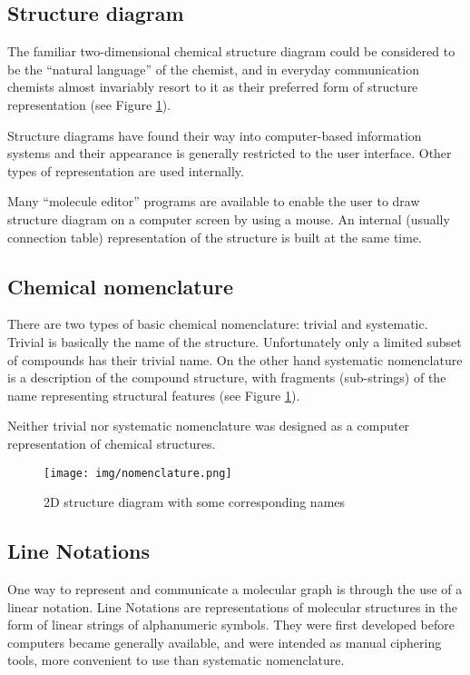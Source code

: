 \documentclass[thesis=M,english]{FITthesis}[2012/10/20]
\begin{document}
\subsection{Structure diagram}
\label{structureDiagramRef}
The familiar two-dimensional chemical structure diagram could be considered to
be the “natural language” of the chemist, and in everyday communication chemists almost invariably resort to it as their preferred form of structure representation (see Figure \ref{fig:nomenclature}).

Structure diagrams have found their way into computer-based information systems and their appearance is generally restricted to the user interface. Other types of representation are used internally.

Many “molecule editor” programs are available to enable the user to draw structure diagram on a computer screen by using a mouse. An internal (usually connection table) representation of the structure is built at the same time.\cite{handbook}

\subsection{Chemical nomenclature}
There are two types of basic chemical nomenclature: trivial and systematic. Trivial is basically the name of the structure. Unfortunately only a limited subset of compounds has their trivial name. On the other hand systematic nomenclature is a description of the compound structure, with fragments (sub-strings) of the name representing structural features (see Figure \ref{fig:nomenclature}).\cite{handbook}

Neither trivial nor systematic nomenclature was designed as a computer representation of chemical structures.

\begin{figure}
  \centering
  \texttt{[image: img/nomenclature.png]}
  \caption{2D structure diagram with some corresponding names}
  \label{fig:nomenclature}
\end{figure}


\subsection{Line Notations}
One way to represent and communicate a molecular graph is through the use of a linear notation. Line Notations are representations of molecular structures in the form of linear strings of alphanumeric symbols. They were first developed before computers became generally available, and were intended as manual ciphering tools, more convenient to use than systematic nomenclature. 
\end{document}

